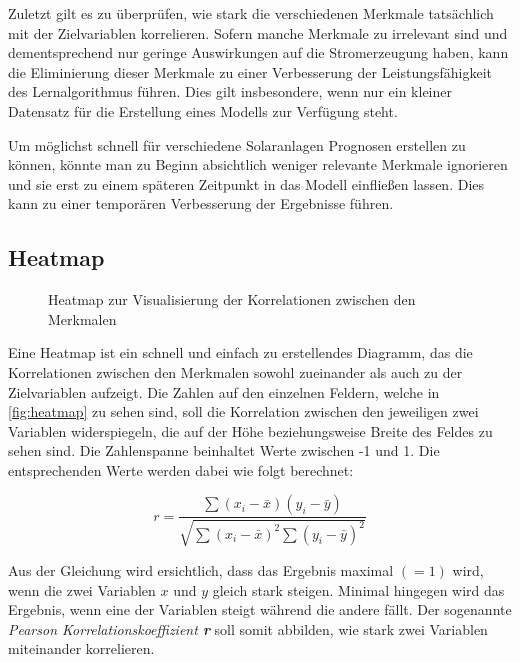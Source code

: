 \documentclass[12pt, a4paper]{article}
\begin{document}
Zuletzt gilt es zu überprüfen, wie stark die verschiedenen Merkmale tatsächlich mit der Zielvariablen korrelieren. Sofern manche Merkmale zu irrelevant sind und dementsprechend nur geringe Auswirkungen auf die Stromerzeugung haben, kann die Eliminierung dieser Merkmale zu einer Verbesserung der Leistungsfähigkeit des Lernalgorithmus führen. Dies gilt insbesondere, wenn nur ein kleiner Datensatz für die Erstellung eines Modells zur Verfügung steht. 

Um möglichst schnell für verschiedene Solaranlagen Prognosen erstellen zu können, könnte man zu Beginn absichtlich weniger relevante Merkmale ignorieren und sie erst zu einem späteren Zeitpunkt in das Modell einfließen lassen. Dies kann zu einer temporären Verbesserung der Ergebnisse führen.

\subsection{Heatmap}

\begin{figure}[H]
\centering
\def\svgwidth{375pt}

\caption{Heatmap zur Visualisierung der Korrelationen zwischen den Merkmalen}
\label{fig:heatmap}
\end {figure}

Eine Heatmap ist ein schnell und einfach zu erstellendes Diagramm, das die Korrelationen zwischen den Merkmalen sowohl zueinander als auch zu der Zielvariablen aufzeigt. Die Zahlen auf den einzelnen Feldern, welche in \autoref{fig:heatmap} zu sehen sind, soll die Korrelation zwischen den jeweiligen zwei Variablen widerspiegeln, die auf der Höhe beziehungsweise Breite des Feldes zu sehen sind. Die Zahlenspanne beinhaltet Werte zwischen -1 und 1. Die entsprechenden Werte werden dabei wie folgt berechnet:

\begin{equation}
r=\frac{\sum(x_i - \bar{x})(y_i - \bar{y})}
{\sqrt{\sum(x_i - \bar{x})^2\sum(y_i -  \bar{y})^2}}
\end{equation}


Aus der Gleichung wird ersichtlich, dass das Ergebnis maximal $(=1)$ wird, wenn die zwei Variablen $x$ und $y$ gleich stark steigen. Minimal hingegen wird das Ergebnis, wenn eine der Variablen steigt während die andere fällt. Der sogenannte \textit{Pearson Korrelationskoeffizient \textbf{r}} soll somit abbilden, wie stark zwei Variablen miteinander korrelieren. 
\end{document}
